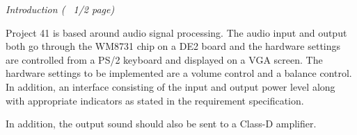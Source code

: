 \emph{Introduction (~ 1/2 page)}


Project 41 is based around audio signal processing. The audio input and output both go through the WM8731 chip on a DE2 board and the hardware settings are controlled from a PS/2 keyboard and displayed on a VGA screen. The hardware settings to be implemented are a volume control and a balance control. In addition, an interface consisting of the input and output power level along with appropriate indicators as stated in the requirement specification.

In addition, the output sound should also be sent to a Class-D amplifier.

